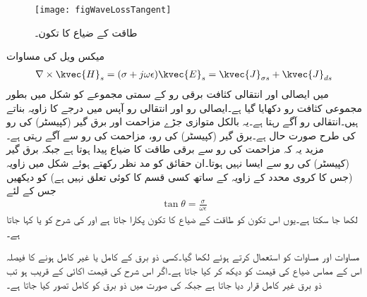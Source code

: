 \begin{figure}
\centering
\texttt{[image: figWaveLossTangent]}
\caption{طاقت کے ضیاع کا تکون۔}
\label{شکل_موج_ضیاع_کا_تکون}
\end{figure}

میکس ویل کی مساوات
\begin{align*}
\nabla \times \kvec{H}_s=(\sigma+j\omega \epsilon)\kvec{E}_s=\kvec{J}_{\sigma s}+\kvec{J}_{d s}
\end{align*}
میں ایصالی اور انتقالی کثافت برقی رو کے سمتی مجموعے کو شکل  میں بطور مجموعی کثافت رو  دکھایا گیا ہے۔ایصالی رو اور انتقالی رو آپس میں  درجے کا زاویہ بناتے ہیں۔انتقالی رو  آگے رہتا ہے۔یہ بالکل متوازی جڑے مزاحمت اور برق گیر (کپیسٹر)  کی رو کی طرح صورت حال ہے۔برق گیر (کپیسٹر)  کی رو، مزاحمت کی رو سے   آگے رہتی ہے۔مزید یہ کہ مزاحمت کی رو سے برقی طاقت  کا ضیاع پیدا ہوتا ہے جبکہ برق گیر (کپیسٹر)  کی رو سے ایسا نہیں ہوتا۔ان حقائق کو مد نظر رکھتے ہوئے  شکل  میں زاویہ  (جس کا کروی محدد کے زاویہ  کے ساتھ کسی قسم کا کوئی تعلق نہیں ہے) کو دیکھیں جس کے لئے
\begin{align}
\tan \theta=\frac{\sigma}{\omega \epsilon}
\end{align}
لکھا جا سکتا ہے۔یوں اس تکون کو طاقت کے ضیاع کا تکون پکارا جاتا ہے اور  کی شرح کو  یا  کہا جاتا ہے۔

مساوات  اور مساوات  کو  استعمال کرتے ہوئے لکھا گیا۔کسی ذو برق کے کامل یا غیر کامل ہونے کا فیصلہ اس کے مماس ضیاع کی قیمت کو دیکھ کر کیا جاتا ہے۔اگر اس شرح کی قیمت اکائی کے قریب ہو تب ذو برق غیر کامل قرار دیا جاتا ہے جبکہ  کی صورت میں ذو برق کو کامل تصور کیا جاتا ہے۔

